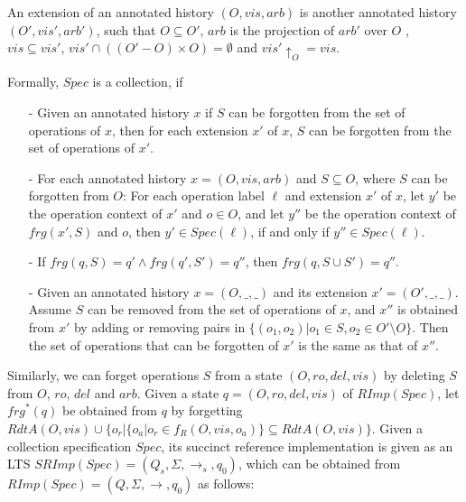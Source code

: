 An extension of an annotated history $(O,\mathit{vis},\mathit{arb})$ is another annotated history $(O',\mathit{vis}',\mathit{arb}')$, such that $O \subseteq O'$, $\mathit{arb}$ is the projection of $\mathit{arb}'$ over $O$ , $\mathit{vis} \subseteq \mathit{vis}'$, $\mathit{vis}' \cap ( (O'-O) \times O ) = \emptyset$ and $\mathit{vis}' \uparrow_{O} = \mathit{vis}$. {\color {red}Formally, $\mathit{Spec}$ is a collection, if

\begin{itemize}
\setlength{\itemsep}{0.5pt}
\item[-] Given an annotated history $x$ if $S$ can be forgotten from the set of operations of $x$, then for each extension $x'$ of $x$, $S$ can be forgotten from the set of operations of $x'$.

\item[-] For each annotated history $x = (O,\mathit{vis},\mathit{arb})$ and $S \subseteq O$, where $S$ can be forgotten from $O$: For each operation label $\ell$ and extension $x'$ of $x$, let $y'$ be the operation context of $x'$ and $o \in O$, and let $y''$ be the operation context of $frg(x',S)$ and $o$, then $y' \in Spec(\ell)$, if and only if $y'' \in Spec(\ell)$. 
    
\item[-] If $\mathit{frg}(q,S) = q' \wedge \mathit{frg}(q',S') = q''$, then $\mathit{frg}(q,S \cup S') =q''$. 

\item[-] Given an annotated history $x = (O,\_,\_)$ and its extension $x' = (O',\_,\_)$. Assume $S$ can be removed from the set of operations of $x$, and $x''$ is obtained from $x'$ by adding or removing pairs in $\{ (o_1,o_2) \vert o_1 \in S, o_2 \in O' \setminus O \}$. Then the set of operations that can be forgotten of $x'$ is the same as that of $x''$.
\end{itemize}
}

Similarly, we can forget operations $S$ from a state $(O,\mathit{ro},\mathit{del},\mathit{vis})$ by deleting $S$ from $O$, $\mathit{ro}$, $\mathit{del}$ and $\mathit{arb}$. {\color {red}Given a state $q = (O,\mathit{ro},\mathit{del},\mathit{vis})$ of $\mathit{RImp}(\mathit{Spec})$, let $\mathit{frg}^*(q)$ be obtained from $q$ by forgetting} $\mathit{RdtA}(O,\mathit{vis}) \cup \{ o_r \vert  \{ o_a \vert o_r \in f_R(O,\mathit{vis},o_a) \} \subseteq \mathit{RdtA}(O,\mathit{vis}) \}$. Given a collection specification $\mathit{Spec}$, its succinct reference implementation is given as an LTS $\mathit{SRImp}(\mathit{Spec}) = (Q_s,\Sigma,\rightarrow_s,q_0)$, which can be obtained from $\mathit{RImp}(\mathit{Spec}) = (Q,\Sigma,\rightarrow,q_0)$ as follows:

